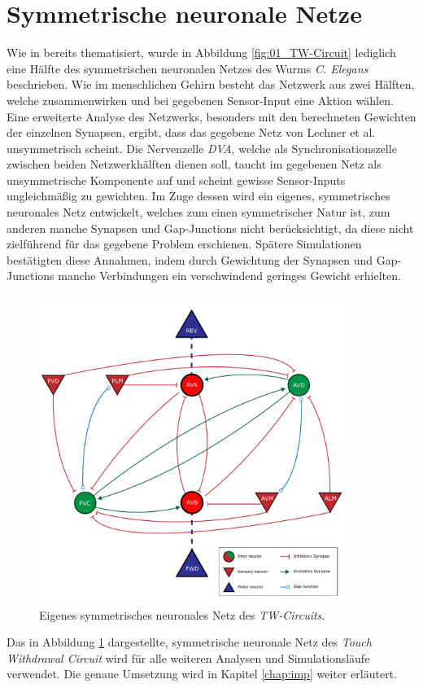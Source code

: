 \section{Symmetrische neuronale Netze}
\label{sec:my_net}
	Wie in \cite{Wicks1996} bereits thematisiert, wurde in Abbildung \ref{fig:01_TW-Circuit} lediglich eine Hälfte des symmetrischen neuronalen Netzes des Wurms \textit{C. Elegans} beschrieben. Wie im menschlichen Gehirn besteht das Netzwerk aus zwei Hälften, welche zusammenwirken und bei gegebenen Sensor-Input eine Aktion wählen. Eine erweiterte Analyse des Netzwerks, besonders mit den berechneten Gewichten der einzelnen Synapsen, ergibt, dass das gegebene Netz von Lechner et al. unsymmetrisch scheint. Die Nervenzelle \textit{DVA}, welche als Synchronisationszelle zwischen beiden Netzwerkhälften dienen soll, taucht im gegebenen Netz als unsymmetrische Komponente auf und scheint gewisse Sensor-Inputs ungleichmäßig zu gewichten. Im Zuge dessen wird ein eigenes, symmetrisches neuronales Netz entwickelt, welches zum einen symmetrischer Natur ist, zum anderen manche Synapsen und Gap-Junctions nicht berücksichtigt, da diese nicht zielführend für das gegebene Problem erschienen. Spätere Simulationen bestätigten diese Annahmen, indem durch Gewichtung der Synapsen und Gap-Junctions manche Verbindungen ein verschwindend geringes Gewicht erhielten.
	\begin{figure}[H] %
		\centering
		\includegraphics[width=10cm]{figures/chap_neuron/Neural_Net_v3_plain.pdf}
		\caption{Eigenes symmetrisches neuronales Netz des \textit{TW-Circuits}.}
		\label{fig:nn_new}
	\end{figure}
	Das in Abbildung \ref{fig:nn_new} dargestellte, symmetrische neuronale Netz des \textit{Touch Withdrawal Circuit} wird für alle weiteren Analysen und Simulationsläufe verwendet. Die genaue Umsetzung wird in Kapitel \ref{chap:imp} weiter erläutert.
	

